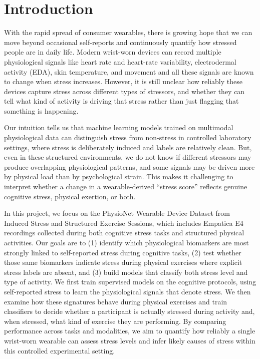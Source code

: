 \documentclass[12pt,letterpaper]{article}
\begin{document}
\section{Introduction}
With the rapid spread of consumer wearables, there is growing hope that we can move beyond occasional self-reports and continuously quantify how stressed people are in daily life. Modern wrist-worn devices can record multiple physiological signals like heart rate and heart-rate variability, electrodermal activity (EDA), skin temperature, and movement and all these signals are known to change when stress increases. However, it is still unclear how reliably these devices capture stress across different types of stressors, and whether they can tell what kind of activity is driving that stress rather than just flagging that something is happening.

Our intuition tells us that machine learning models trained on multimodal physiological data can distinguish stress from non-stress in controlled laboratory settings, where stress is deliberately induced and labels are relatively clean. But, even in these structured environments, we do not know if different stressors may produce overlapping physiological patterns, and some signals may be driven more by physical load than by psychological strain. This makes it challenging to interpret whether a change in a wearable-derived “stress score” reflects genuine cognitive stress, physical exertion, or both.

In this project, we focus on the PhysioNet Wearable Device Dataset from Induced Stress and Structured Exercise Sessions, which includes Empatica E4 recordings collected during both cognitive stress tasks and structured physical activities. Our goals are to (1) identify which physiological biomarkers are most strongly linked to self-reported stress during cognitive tasks, (2) test whether those same biomarkers indicate stress during physical exercises where explicit stress labels are absent, and (3) build models that classify both stress level and type of activity. We first train supervised models on the cognitive protocols, using self-reported stress to learn the physiological signals that denote stress. We then examine how these signatures behave during physical exercises and train classifiers to decide whether a participant is actually stressed during activity and, when stressed, what kind of exercise they are performing. By comparing performance across tasks and modalities, we aim to quantify how reliably a single wrist-worn wearable can assess stress levels and infer likely causes of stress within this controlled experimental setting.
\end{document}
